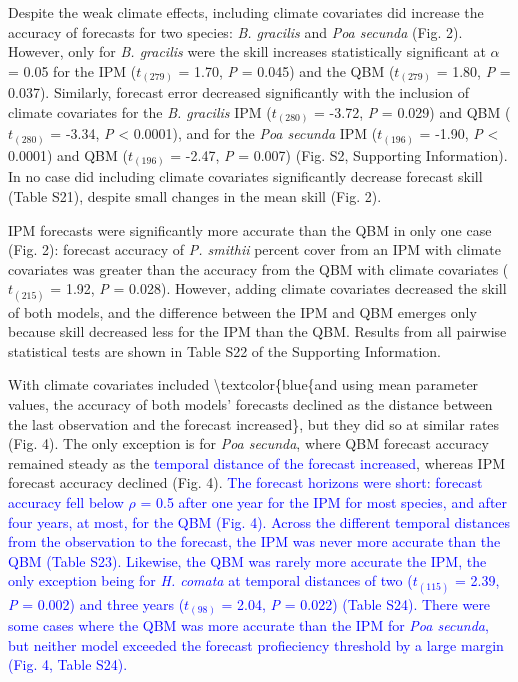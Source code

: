 \documentclass[12pt,]{article}
\begin{document}
Despite the weak climate effects, including climate covariates did
increase the accuracy of forecasts for two species: \emph{B. gracilis}
and \emph{Poa secunda} (Fig. 2). However, only for \emph{B. gracilis}
were the skill increases statistically significant at \(\alpha\) = 0.05
for the IPM (\(t_{(279)}\) = 1.70, \emph{P} = 0.045) and the QBM
(\(t_{(279)}\) = 1.80, \emph{P} = 0.037). Similarly, forecast error
decreased significantly with the inclusion of climate covariates for the
\emph{B. gracilis} IPM (\(t_{(280)}\) = -3.72, \emph{P} = 0.029) and QBM
(\(t_{(280)}\) = -3.34, \emph{P} \textless{} 0.0001), and for the
\emph{Poa secunda} IPM (\(t_{(196)}\) = -1.90, \emph{P} \textless{}
0.0001) and QBM (\(t_{(196)}\) = -2.47, \emph{P} = 0.007) (Fig. S2,
Supporting Information). In no case did including climate covariates
significantly decrease forecast skill (Table S21), despite small changes
in the mean skill (Fig. 2).

IPM forecasts were significantly more accurate than the QBM in only one
case (Fig. 2): forecast accuracy of \emph{P. smithii} percent cover from
an IPM with climate covariates was greater than the accuracy from the
QBM with climate covariates (\(t_{(215)}\) = 1.92, \emph{P} = 0.028).
However, adding climate covariates decreased the skill of both models,
and the difference between the IPM and QBM emerges only because skill
decreased less for the IPM than the QBM. Results from all pairwise
statistical tests are shown in Table S22 of the Supporting Information.

With climate covariates included \textbackslash{}textcolor\{blue\{and
using mean parameter values, the accuracy of both models' forecasts
declined as the distance between the last observation and the forecast
increased\}, but they did so at similar rates (Fig. 4). The only
exception is for \emph{Poa secunda}, where QBM forecast accuracy
remained steady as the
\textcolor{blue}{temporal distance of the forecast increased}, whereas
IPM forecast accuracy declined (Fig. 4).
\textcolor{blue}{The forecast horizons were short: forecast accuracy fell below $\rho$ = 0.5 after one year for the IPM for most species, and after four years, at most, for the QBM (Fig. 4).
Across the different temporal distances from the observation to the forecast, the IPM was never more accurate than the QBM (Table S23).
Likewise, the QBM was rarely more accurate the IPM, the only exception being for \emph{H. comata} at temporal distances of two ($t_{(115)}$ = 2.39, \emph{P} = 0.002) and three years ($t_{(98)}$ = 2.04, \emph{P} = 0.022) (Table S24).
There were some cases where the QBM was more accurate than the IPM for \emph{Poa secunda}, but neither model exceeded the forecast profieciency threshold by a large margin (Fig. 4, Table S24).}
\end{document}
